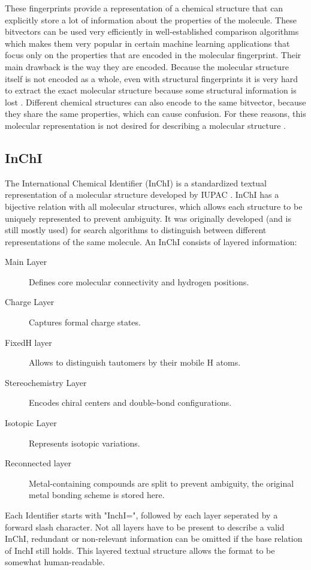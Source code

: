 These fingerprints provide a representation of a chemical structure that can explicitly store a lot of information about the properties of the molecule.
These bitvectors can be used very efficiently in well-established comparison algorithms which makes them very popular in certain machine learning applications that focus only on the properties that are encoded in the molecular fingerprint. Their main drawback is the way they are encoded. Because the molecular structure itself is not encoded as a whole, even with structural fingerprints it is very hard to extract the exact molecular structure because some structural information is lost \cite{kretschmer2023small}. Different chemical structures can also encode to the same bitvector, because they share the same properties, which can cause confusion. For these reasons, this molecular representation is not desired for describing a molecular structure \cite{dablander2024sort}.

\subsection{InChI}

The International Chemical Identifier (InChI) is a standardized textual representation of a molecular structure developed by IUPAC \cite{heller2015inchi}. InChI has a bijective relation with all molecular structures, which allows each structure to be uniquely represented to prevent ambiguity. It was originally developed (and is still mostly used) for search algorithms to distinguish between different representations of the same molecule. An InChI consists of layered information:
\begin{description}
    \item[Main Layer]Defines core molecular connectivity and hydrogen positions.
    \item[Charge Layer]Captures formal charge states.
    \item[FixedH layer]Allows to distinguish tautomers by their mobile H atoms.
    \item[Stereochemistry Layer]Encodes chiral centers and double-bond configurations.
    \item[Isotopic Layer]Represents isotopic variations.
    \item[Reconnected layer]Metal-containing compounds are split to prevent ambiguity, the original metal bonding scheme is stored here.
\end{description}

Each Identifier starts with "InchI=", followed by each layer seperated by a forward slash character. Not all layers have to be present to describe a valid InChI, redundant or non-relevant information can be omitted if the base relation of InchI still holds. This layered textual structure allows the format to be somewhat human-readable.

